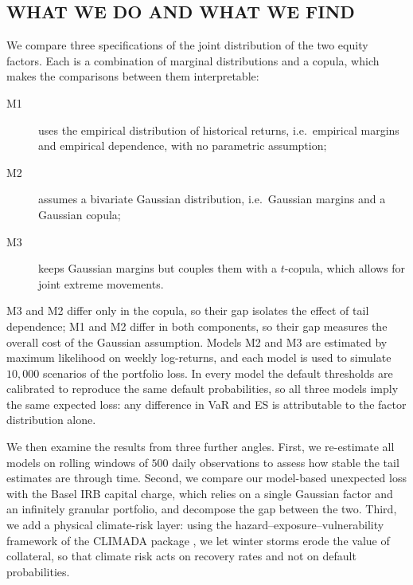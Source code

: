 \subsection{WHAT WE DO AND WHAT WE FIND}
\label{subsec:approach}

We compare three specifications of the joint distribution of the two equity factors. Each is a combination of marginal distributions and a copula, which makes the comparisons between them interpretable:
\begin{description}
\item[M1] uses the empirical distribution of historical returns, i.e.\ empirical margins and empirical dependence, with no parametric assumption;
\item[M2] assumes a bivariate Gaussian distribution, i.e.\ Gaussian margins and a Gaussian copula;
\item[M3] keeps Gaussian margins but couples them with a $t$-copula, which allows for joint extreme movements.
\end{description}
M3 and M2 differ only in the copula, so their gap isolates the effect of tail dependence; M1 and M2 differ in both components, so their gap measures the overall cost of the Gaussian assumption. Models M2 and M3 are estimated by maximum likelihood on weekly log-returns, and each model is used to simulate $10{,}000$ scenarios of the portfolio loss. In every model the default thresholds are calibrated to reproduce the same default probabilities, so all three models imply the same expected loss: any difference in VaR and ES is attributable to the factor distribution alone.

We then examine the results from three further angles. First, we re-estimate all models on rolling windows of $500$ daily observations to assess how stable the tail estimates are through time. Second, we compare our model-based unexpected loss with the Basel IRB capital charge, which relies on a single Gaussian factor and an infinitely granular portfolio, and decompose the gap between the two. Third, we add a physical climate-risk layer: using the hazard--exposure--vulnerability framework of the CLIMADA package \citep{AznarSiguan19}, we let winter storms erode the value of collateral, so that climate risk acts on recovery rates and not on default probabilities.

